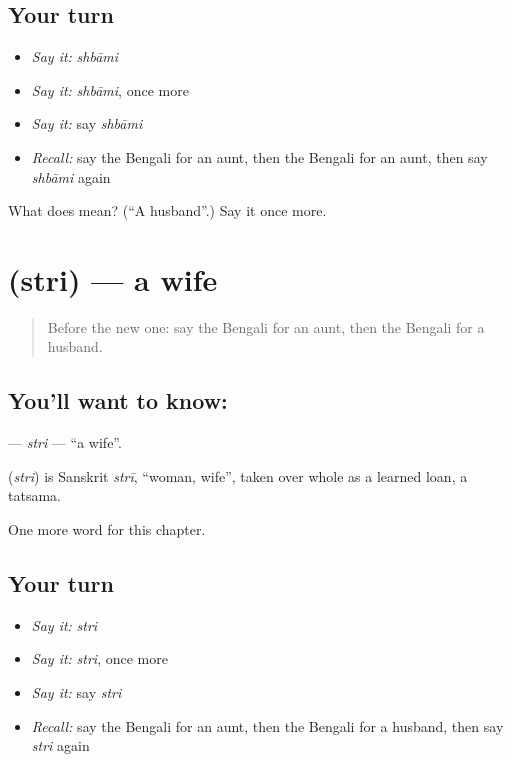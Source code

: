 \subsection*{Your turn}
\begin{itemize}
\raggedright
  \item \emph{Say it:} \emph{shbāmi}
  \item \emph{Say it:} \emph{shbāmi}, once more
  \item \emph{Say it:} say \emph{shbāmi}
  \item \emph{Recall:} say the Bengali for an aunt, then the Bengali for an aunt, then say \emph{shbāmi} again
\end{itemize}

\begin{tcolorbox}[breakable,colback=teal!4,colframe=teal!35!black,title={Before you move on}]
What does  mean? (\textquotedblleft{}A husband\textquotedblright{}.) Say it once more.
\end{tcolorbox}
\section[\texorpdfstring{\bn{স্ত্রী} (stri)}{স্ত্রী (stri)}]{ (stri) — a wife}

\label{lesson:BN-C47-stri}



\begin{quote}
Before the new one: say the Bengali for an aunt, then the Bengali for a husband.
\end{quote}

\subsection*{You'll want to know: }
\textbf{} — \emph{stri} — \textquotedblleft{}a wife\textquotedblright{}.

\begin{cousinweb}
\textbf{} (\emph{stri}) is Sanskrit \emph{strī}, \textquotedblleft{}woman, wife\textquotedblright{}, taken over whole as a learned loan, a tatsama.
\end{cousinweb}

\begin{grammarlens}[title={What you've built}]
One more word for this chapter.
\end{grammarlens}

\subsection*{Your turn}
\begin{itemize}
\raggedright
  \item \emph{Say it:} \emph{stri}
  \item \emph{Say it:} \emph{stri}, once more
  \item \emph{Say it:} say \emph{stri}
  \item \emph{Recall:} say the Bengali for an aunt, then the Bengali for a husband, then say \emph{stri} again
\end{itemize}

